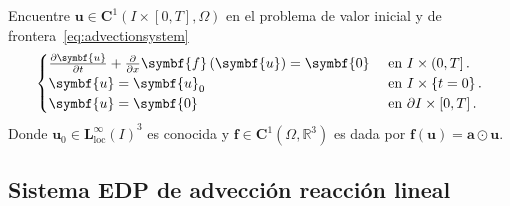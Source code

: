 Encuentre
\begin{math}
	\symbf{u}\in
	\symbf{C}^{1}\left(I\times\left[0,T\right],\Omega\right)
\end{math}
en el problema de valor inicial y de frontera~\eqref{eq:advectionsystem}
\begin{equation}\label{eq:advectionsystem}
	\begin{cases}
		\diffp{\symbf{u}}{t}+\diffp{}{x}\symbf{f}\left(\symbf{u}\right)=
		\symbf{0}     &
		\text{ en }I\times\left(0,T\right].   \\
		\symbf{u}                                                      =
		\symbf{u}_{0} &
		\text{ en }I\times\left\{t=0\right\}. \\
		\symbf{u}                                                      =
		\symbf{0}     &
		\text{ en }\partial I\times\left[0,T\right].
	\end{cases}
\end{equation}
Donde
\begin{math}
	\symbf{u}_{0}\in
	{\symbf{L}^{\infty}_{\text{loc}}\left(I\right)}^{3}
\end{math}
es conocida y
\begin{math}
	\symbf{f}\in
	\symbf{C}^{1}\left(\Omega,\mathbb{R}^{3}\right)
\end{math}
es dada por
\begin{math}
	\symbf{f}\left(\symbf{u}\right)=
	\symbf{a}\odot\symbf{u}
\end{math}.

\subsection*{Sistema EDP de advección reacción lineal}

